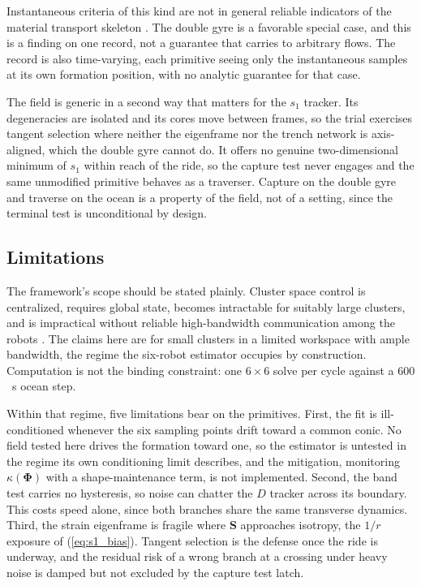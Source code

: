 \documentclass[lettersize,journal]{IEEEtran}
\begin{document}
Instantaneous criteria of this kind are not in general reliable indicators
of the material transport skeleton \cite{16}. The double gyre is a
favorable special case, and this is a finding on one record, not a
guarantee that carries to arbitrary flows. The record is also
time-varying, each primitive seeing only the instantaneous samples at
its own formation position, with no analytic guarantee for that case.

The field is generic in a second way that matters for the $s_1$ tracker.
Its degeneracies are isolated and its cores move between frames, so the
trial exercises tangent selection where neither the eigenframe nor the
trench network is axis-aligned, which the double gyre cannot do. It
offers no genuine two-dimensional minimum of $s_1$ within reach of the
ride, so the capture test never engages and the same unmodified
primitive behaves as a traverser. Capture on the double gyre and
traverse on the ocean is a property of the field, not of a setting,
since the terminal test is unconditional by design.

\subsection{Limitations}
\label{sec:disc_limits}

The framework's scope should be stated plainly. Cluster
space control is centralized, requires global state, becomes intractable
for suitably large clusters, and is impractical without reliable
high-bandwidth communication among the robots \cite{31}. The claims here
are for small clusters in a limited workspace with ample bandwidth, the
regime the six-robot estimator occupies by construction. Computation is
not the binding constraint: one $6 \times 6$ solve per cycle against a
$600$~s ocean step.

Within that regime, five limitations bear on the primitives. First, the
fit is ill-conditioned whenever the six sampling points drift toward a
common conic. No field tested here drives the formation toward one, so the estimator
is untested in the regime its own conditioning limit describes, and the
mitigation, monitoring $\kappa(\boldsymbol{\Phi})$ with a
shape-maintenance term, is not implemented.
Second, the band test carries no hysteresis, so noise can chatter the
$D$ tracker across its boundary. This costs speed alone, since both branches share the same transverse
dynamics.
Third, the strain eigenframe is fragile where $\mathbf{S}$ approaches
isotropy, the $1/r$ exposure of (\ref{eq:s1_bias}). Tangent selection is the defense once the ride is underway, and the
residual risk of a wrong branch at a crossing under heavy noise is
damped but not excluded by the capture test latch.
\end{document}

